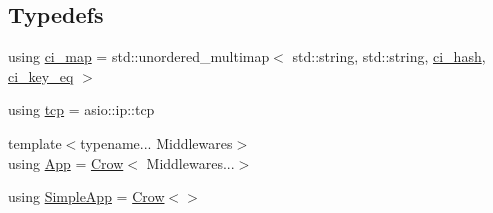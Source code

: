 \subsection*{Typedefs}
\begin{DoxyCompactItemize}
\item 
using \hyperlink{namespacecrow_a9090432313cd58380727a6c4384ee792}{ci\-\_\-map} = std\-::unordered\-\_\-multimap$<$ std\-::string, std\-::string, \hyperlink{structcrow_1_1ci__hash}{ci\-\_\-hash}, \hyperlink{structcrow_1_1ci__key__eq}{ci\-\_\-key\-\_\-eq} $>$
\item 
using \hyperlink{namespacecrow_a65f96f2358b6394677de6a13301e9e69}{tcp} = asio\-::ip\-::tcp
\item 
{\footnotesize template$<$typename... Middlewares$>$ }\\using \hyperlink{namespacecrow_a153c1bf24903d1a8629ef6eaf045110b}{App} = \hyperlink{classcrow_1_1_crow}{Crow}$<$ Middlewares...$>$
\item 
using \hyperlink{namespacecrow_a3603179c9794548cac2c9990685178b4}{Simple\-App} = \hyperlink{classcrow_1_1_crow}{Crow}$<$$>$
\end{DoxyCompactItemize}
